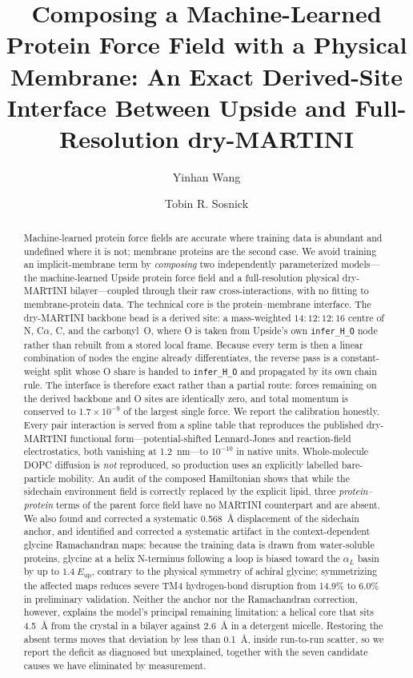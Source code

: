 \documentclass[journal=jctcce,manuscript=article,layout=twocolumn]{achemso}
\author{Yinhan Wang}
\affiliation{Department of Chemistry, The University of Chicago, Chicago, Illinois 60637, United States}
\author{Tobin R. Sosnick}
\affiliation{Department of Biochemistry and Molecular Biology, The University of Chicago, Chicago, Illinois 60637, United States}
\title{Composing a Machine-Learned Protein Force Field with a Physical Membrane:
An Exact Derived-Site Interface Between Upside and Full-Resolution dry-MARTINI}
\begin{document}
\begin{abstract}
Machine-learned protein force fields are accurate where training data is abundant
and undefined where it is not; membrane proteins are the second case. We avoid
training an implicit-membrane term by \emph{composing} two independently
parameterized models---the machine-learned Upside protein force field and a
full-resolution physical dry-MARTINI bilayer---coupled through their raw
cross-interactions, with no fitting to membrane-protein data. The technical core is
the protein--membrane interface. The dry-MARTINI backbone bead is a derived site: a
mass-weighted $14{:}12{:}12{:}16$ centre of N, C$\alpha$, C, and the carbonyl~O,
where O is taken from Upside's own \texttt{infer\_H\_O} node rather than rebuilt
from a stored local frame. Because every term is then a linear combination of nodes
the engine already differentiates, the reverse pass is a constant-weight split whose
O share is handed to \texttt{infer\_H\_O} and propagated by its own chain rule. The
interface is therefore exact rather than a partial route: forces remaining on the
derived backbone and O sites are identically zero, and total momentum is conserved
to $1.7\times10^{-9}$ of the largest single force. We report the calibration
honestly. Every pair interaction is served from a spline table that reproduces the
published dry-MARTINI functional form---potential-shifted Lennard-Jones and
reaction-field electrostatics, both vanishing at 1.2~nm---to $10^{-10}$ in native
units. Whole-molecule DOPC diffusion is \emph{not} reproduced, so production uses an
explicitly labelled bare-particle mobility. An audit of the composed Hamiltonian shows
that while the sidechain environment field is correctly replaced by the explicit
lipid, three \emph{protein--protein} terms of the parent force field have no MARTINI
counterpart and are absent. We also found and corrected a systematic 0.568~\AA{}
displacement of the sidechain anchor, and identified and corrected a systematic
artifact in the context-dependent glycine Ramachandran maps: because the training
data is drawn from water-soluble proteins, glycine at a helix N-terminus following a
loop is biased toward the $\alpha_L$ basin by up to $1.4~E_\mathrm{up}$, contrary to
the physical symmetry of achiral glycine; symmetrizing the affected maps reduces
severe TM4 hydrogen-bond disruption from 14.9\% to 6.0\% in preliminary validation.
Neither the anchor nor the Ramachandran correction, however, explains the model's
principal remaining limitation: a helical core that sits 4.5~\AA{} from the crystal
in a bilayer against 2.6~\AA{} in a detergent micelle. Restoring the absent terms
moves that deviation by less than 0.1~\AA, inside run-to-run scatter, so we report
the deficit as diagnosed but unexplained, together with the seven candidate causes
we have eliminated by measurement.
\end{abstract}
\end{document}
